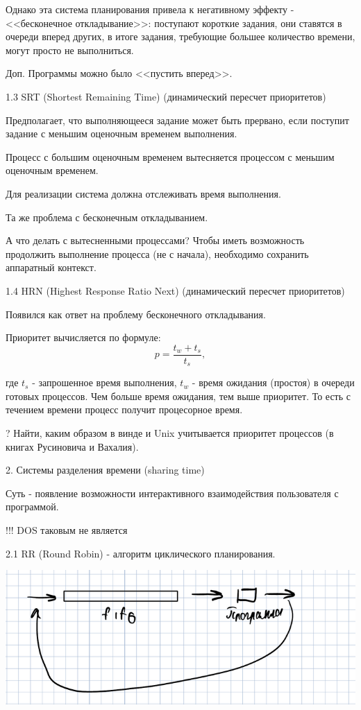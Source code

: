 \documentclass[14pt, a4paper]{article}
\begin{document}
	Однако эта система планирования привела к негативному эффекту - <<бесконечное откладывание>>: поступают короткие задания, они ставятся в очереди вперед других, в итоге задания, требующие большее количество времени, могут просто не выполниться.
	
	Доп. Программы можно было <<пустить вперед>>.
	
	1.3 SRT (Shortest Remaining Time) (динамический пересчет приоритетов)
	
	Предполагает, что выполняющееся задание может быть прервано, если поступит задание с меньшим оценочным временем выполнения.
	
	Процесс с большим оценочным временем вытесняется процессом с меньшим оценочным временем.
	
	Для реализации система должна отслеживать время выполнения.
	
	Та же проблема с бесконечным откладыванием.
	
	А что делать с вытесненными процессами? Чтобы иметь возможность продолжить выполнение процесса (не с начала), необходимо сохранить аппаратный контекст.
	
	1.4 HRN (Highest Response Ratio Next) (динамический пересчет приоритетов)
	
	Появился как ответ на проблему бесконечного откладывания.
	
	Приоритет вычисляется по формуле: $$p = \frac{t_w + t_s}{t_s},$$
	
	где $t_s$ - запрошенное время выполнения, $t_w$ - время ожидания (простоя) в очереди готовых процессов. Чем больше время ожидания, тем выше приоритет. То есть с течением времени процесс получит процесорное время.
	
	? Найти, каким образом в винде и Unix учитывается приоритет процессов (в книгах Русиновича и Вахалия).
	
	2. Системы разделения времени (sharing time)
	
	Суть - появление возможности интерактивного взаимодействия пользователя с программой.
	
	!!! DOS таковым не является
	
	2.1 RR (Round Robin) - алгоритм циклического планирования.
	
	\includegraphics[width=\linewidth]{2}
	
\end{document}
